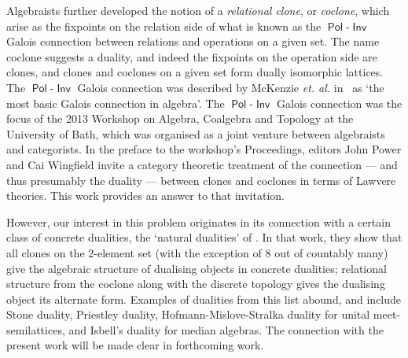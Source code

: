 \documentclass[11pt, a4paper, twoside,leqno]{amsart}
\numberwithin{equation}{section}
\theoremstyle{plain}
\theoremstyle{definition}
\DeclareMathOperator{\Pol}{\mathsf{Pol}}
\DeclareMathOperator{\Inv}{\mathsf{Inv}}
\begin{document}
Algebraists further developed the
notion of a \emph{relational clone}, or \emph{coclone}, which
arise as the fixpoints on the relation side of what is known as the
\(\Pol\)-\(\Inv\) Galois connection between relations and operations
on a given set. The name coclone suggests a duality, and indeed the fixpoints on the operation
side are clones, and clones and coclones on a given set form dually
isomorphic lattices. The
\(\Pol\)-\(\Inv\) Galois connection was described by McKenzie {\it et. al.} in~\cite{McKenzie:1987aa}
as `the most
basic Galois connection in algebra'.
The \(\Pol\)-\(\Inv\) Galois
connection was the focus of the 2013 Workshop on Algebra, Coalgebra and Topology at the
University of Bath, which was organised
as a joint venture between algebraists and categorists.
In the preface to the workshop's Proceedings,
editors John Power and Cai Wingfield invite a category theoretic treatment
of the connection --- and thus presumably the duality --- between clones and coclones in terms of Lawvere
theories.  This work provides an answer to that invitation.


However, our interest in this problem originates in its connection
with a certain class of concrete dualities, the `natural dualities' of
\cite{Clark:1998aa}. %
In that work, they show that all clones on the 2-element set (with the exception
of 8 out of countably many) give the algebraic structure
of dualising objects in concrete dualities; relational structure
from the coclone along with the discrete topology gives the dualising
object its alternate form. Examples of dualities from this list
abound, and include Stone duality, Priestley
duality, Hofmann-Mislove-Stralka duality for unital meet-semilattices,
and Isbell's duality for median algebras. The connection with the
present work will be made clear in forthcoming
work. 
\end{document}
